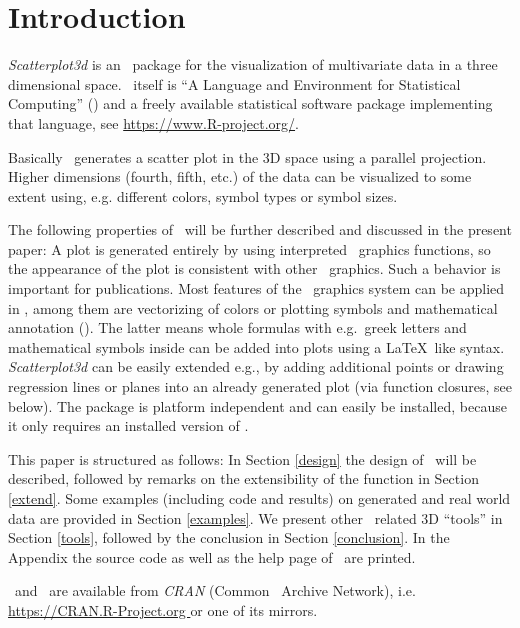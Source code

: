 \section{Introduction\label{introduction}}
\emph{Scatterplot3d} is an \RR\ package for the visualization of
multivariate data in a three dimensional space.
\RR\ itself is ``A Language and Environment for Statistical Computing'' (\cite{r-ref}) and a freely
available statistical software package implementing that language, see
\url{https://www.R-project.org/}.

Basically \sdd\ generates a scatter plot in the 3D space using a parallel
projection.  Higher dimensions (fourth, fifth, etc.) of the data can be
visualized to some extent using, e.g. different colors, symbol types or
symbol sizes.

The following properties of \sdd\ will be further described and discussed
in the present paper:
%
A plot is generated entirely by using interpreted \RR\ graphics functions,
so the appearance of the plot is consistent with other \RR\ graphics.
Such a behavior is %
important for publications.
Most features of the \RR\ graphics system can be applied in \sdd , among
them are vectorizing of colors or plotting symbols and mathematical
annotation (\cite{murrell00}).
The latter means whole formulas with e.g.\ greek letters and mathematical
symbols inside can be added into plots using a \LaTeX\ like syntax.
%
\emph{Scatterplot3d} can be easily extended e.g., by adding additional
points or drawing regression lines or planes into an already generated
plot (via function closures, see below).
The package is platform independent and can easily be installed,
because it only requires an installed version of \RR.

This paper is structured as follows:
%
In Section \ref{design} the design of \sdd\ will be described, followed by
remarks on the extensibility of the function in Section \ref{extend}.
%
Some examples (including code and results) on generated and real world data
are provided in Section \ref{examples}.
%
We present other \RR\ related 3D ``tools'' in Section \ref{tools}, followed
by the conclusion in Section \ref{conclusion}.
%
In the Appendix the source code as well as the help page of \sdd\ are
printed.

\RR\ and \sdd\ are available from \emph{CRAN} (Common \RR\ Archive
Network), i.e. \url{https://CRAN.R-Project.org } or one of its mirrors.

